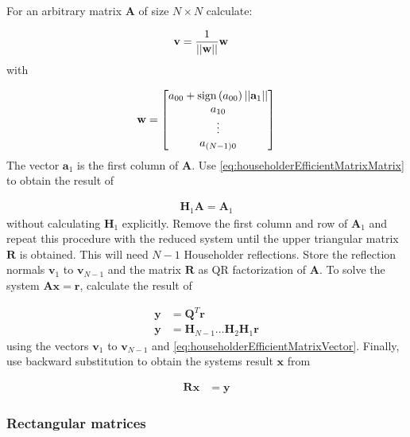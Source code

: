 For an arbitrary matrix $\mathbf{A}$ of size $N \times N$ calculate:

\begin{align}
\label{eq:qrReflectionUnitNormal}
\mathbf{v} 
&=
\frac{1}{\left\vert\left\vert\mathbf{w}\right\vert\right\vert}\mathbf{w}
\end{align}
%
with 

\begin{align}
\label{eq:qrReflectionNormal}
\mathbf{w} = 
\begin{bmatrix}
a_{00} + \textrm{sign}\left(a_{00}\right) \left\vert\left\vert\mathbf{a}_1\right\vert\right\vert\\
a_{10}\\
\vdots\\
a_{\left(N-1\right)0}
\end{bmatrix}
\end{align}
%
The vector $\mathbf{a}_1$ is the first column of $\mathbf{A}$. 
Use \cref{eq:householderEfficientMatrixMatrix} to obtain the result of

\begin{align}
\mathbf{H}_1 \mathbf{A} = \mathbf{A}_1
\end{align}
%
without calculating $\mathbf{H}_1$ explicitly.
Remove the first column and row of $\mathbf{A}_1$ and repeat this procedure with the reduced system until the upper triangular matrix $\mathbf{R}$ is obtained.
This will need $N-1$ Householder reflections.
Store the reflection normals $\mathbf{v}_1$ to $\mathbf{v}_{N-1}$ and the matrix $\mathbf{R}$ as QR factorization of $\mathbf{A}$.
To solve the system $\mathbf{A}\mathbf{x}=\mathbf{r}$, calculate the result of

\begin{align}
\mathbf{y} &= \mathbf{Q}^T\mathbf{r}\\
\mathbf{y} &= \mathbf{H}_{N-1} \hdots \mathbf{H}_{2}\mathbf{H}_{1}\mathbf{r}
\end{align}
%
using the vectors $\mathbf{v}_1$ to $\mathbf{v}_{N-1}$ and \cref{eq:householderEfficientMatrixVector}.
Finally, use backward substitution to obtain the systems result $\mathbf{x}$ from 

\begin{align}
\mathbf{R}\mathbf{x} &= \mathbf{y}
\end{align}





\subsubsection{Rectangular matrices}

